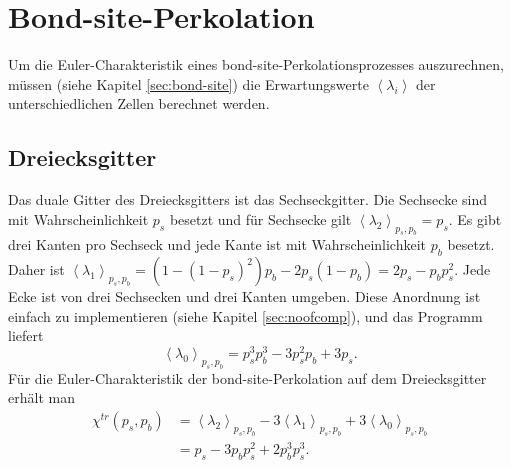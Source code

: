 \section{Bond-site-Perkolation}
\label{sec:appbond-site}
Um die Euler-Charakteristik eines bond-site-Perkolationsprozesses auszurechnen, m\"ussen (siehe Kapitel \ref{sec:bond-site}) die Erwartungswerte $\left< \lambda_i\right>$ der unterschiedlichen Zellen berechnet werden. 
\subsection{Dreiecksgitter}
Das duale Gitter des Dreiecksgitters ist das Sechseckgitter. Die Sechsecke sind mit Wahrscheinlichkeit $p_s$ besetzt und f\"ur Sechsecke gilt $\left<\lambda_2\right>_{p_s,p_b}=p_s$. Es gibt drei Kanten pro Sechseck und jede Kante ist mit Wahrscheinlichkeit $p_b$ besetzt. Daher ist $\left<\lambda_1\right>_{p_s,p_b}=(1-(1-p_s)^2)p_b-2p_s(1-p_b)=2p_s-p_bp_s^2$. Jede Ecke ist von drei Sechsecken und drei Kanten umgeben. Diese Anordnung ist einfach zu implementieren (siehe Kapitel \ref{sec:noofcomp}), und das Programm liefert
\begin{equation}   
\left< \lambda_0 \right>_{p_s,p_b} = p_s^3p_b^3-3p_s^2p_b+3p_s.
\end{equation}
F\"ur die Euler-Charakteristik der bond-site-Perkolation auf dem Dreiecksgitter erh\"alt man 
\begin{equation}
  \begin{split} \chi^{tr}(p_s,p_b)& = \left<\lambda_2\right>_{p_s,p_b}-3\left<\lambda_1\right>_{p_s,p_b}+3\left< \lambda_0 \right>_{p_s,p_b}\\
& = p_s-3p_bp_s^2+2p_b^3p_s^3.
\end{split}
\end{equation}

